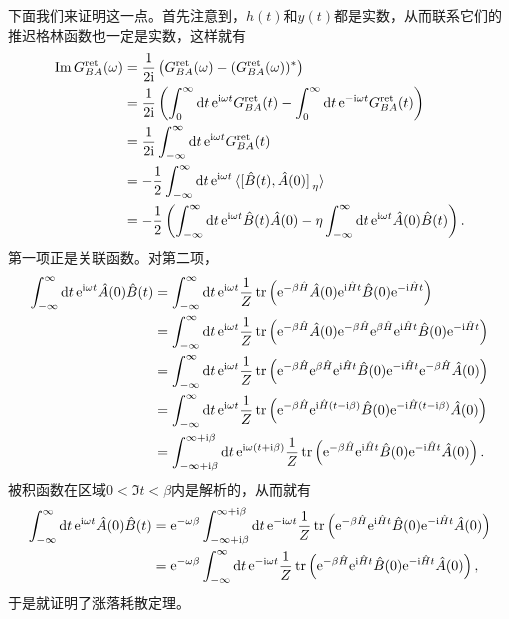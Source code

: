 \documentclass[hyperref, UTF8, a4paper]{ctexart}
\newcommand*{\ii}{\mathrm{i}}
\newcommand*{\ee}{\mathrm{e}}
\begin{document}
下面我们来证明这一点。首先注意到，$h(t)$和$y(t)$都是实数，从而联系它们的推迟格林函数也一定是实数，这样就有
\[
    \begin{aligned}
        \Im G_{BA}^\text{ret}(\omega) &= \frac{1}{2\ii} \left( G_{BA}^\text{ret}(\omega) -( G_{BA}^\text{ret}(\omega))^* \right) \\
        &= \frac{1}{2\ii} \left( \int_0^\infty \dd{t} \ee^{\ii \omega t} G_{BA}^\text{ret}(t) -\int_0^\infty \dd{t} \ee^{- \ii \omega t} G_{BA}^\text{ret}(t) \right) \\
        &= \frac{1}{2\ii} \int_{-\infty}^\infty \dd{t} \ee^{\ii \omega t} G_{BA}^\text{ret}(t) \\
        &= - \frac{1}{2} \int_{-\infty}^\infty \dd{t} \ee^{\ii \omega t} \expval*{\comm*{\hat{B}(t)}{\hat{A}(0)}_\eta} \\
        &= - \frac{1}{2} \left( \int_{-\infty}^\infty \dd{t} \ee^{\ii \omega t} \hat{B}(t) \hat{A}(0) - \eta \int_{-\infty}^\infty \dd{t} \ee^{\ii \omega t} \hat{A}(0) \hat{B}(t) \right).
    \end{aligned}
\]
第一项正是关联函数。对第二项，
\[
    \begin{aligned}
        \int_{-\infty}^\infty \dd{t} \ee^{\ii \omega t} \hat{A}(0) \hat{B}(t) &= \int_{-\infty}^\infty \dd{t} \ee^{\ii \omega t} \frac{1}{Z} \trace \left( \ee^{-\beta \hat{H}} \hat{A}(0) \ee^{\ii \hat{H} t} \hat{B}(0) \ee^{ - \ii \hat{H} t} \right) \\
        &= \int_{-\infty}^\infty \dd{t} \ee^{\ii \omega t} \frac{1}{Z} \trace \left( \ee^{-\beta\hat{H}} \hat{A}(0) \ee^{-\beta \hat{H}} \ee^{\beta \hat{H}} \ee^{\ii \hat{H} t} \hat{B}(0) \ee^{ - \ii \hat{H} t} \right) \\
        &= \int_{-\infty}^\infty \dd{t} \ee^{\ii \omega t} \frac{1}{Z} \trace \left( \ee^{-\beta \hat{H}} \ee^{\beta \hat{H}} \ee^{\ii \hat{H} t} \hat{B}(0) \ee^{ - \ii \hat{H} t} \ee^{-\beta\hat{H}} \hat{A}(0) \right) \\
        &= \int_{-\infty}^\infty \dd{t} \ee^{\ii \omega t} \frac{1}{Z} \trace \left( \ee^{-\beta \hat{H}} \ee^{\ii \hat{H} (t - \ii \beta)} \hat{B}(0) \ee^{ - \ii \hat{H} (t - \ii \beta)} \hat{A}(0) \right) \\
        &= \int_{-\infty + \ii\beta}^{\infty+\ii \beta} \dd{t} \ee^{\ii \omega (t + \ii \beta)} \frac{1}{Z} \trace \left( \ee^{-\beta \hat{H}} \ee^{\ii \hat{H} t} \hat{B}(0) \ee^{ - \ii \hat{H} t} \hat{A}(0) \right).
    \end{aligned}
\]
被积函数在区域$0 < \Im t < \beta$内是解析的，从而就有
\[
    \begin{aligned}
        \int_{-\infty}^\infty \dd{t} \ee^{\ii \omega t} \hat{A}(0) \hat{B}(t)  &= \ee^{-\omega \beta} \int_{-\infty+\ii \beta}^{\infty+\ii \beta} \dd{t} \ee^{-\ii \omega t} \frac{1}{Z} \trace \left( \ee^{-\beta \hat{H}} \ee^{\ii \hat{H} t} \hat{B}(0) \ee^{ - \ii \hat{H} t} \hat{A}(0) \right) \\
        &= \ee^{-\omega \beta} \int_{-\infty}^{\infty} \dd{t} \ee^{-\ii \omega t} \frac{1}{Z} \trace \left( \ee^{-\beta \hat{H}} \ee^{\ii \hat{H} t} \hat{B}(0) \ee^{ - \ii \hat{H} t} \hat{A}(0) \right),
    \end{aligned}
\]
于是就证明了涨落耗散定理。
\end{document}
